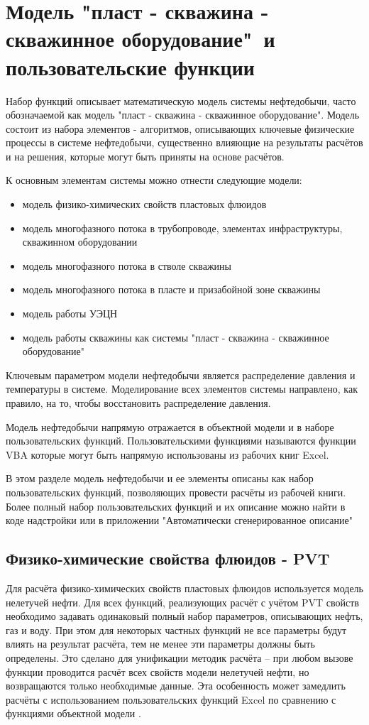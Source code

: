 \chapter{Модель "пласт - скважина - скважинное оборудование"\ и пользовательские функции \unf{}}
Набор функций \unf{} описывает математическую модель системы нефтедобычи, часто обозначаемой как модель "пласт - скважина - скважинное оборудование". Модель состоит из набора элементов - алгоритмов, описывающих ключевые физические процессы в системе нефтедобычи, существенно влияющие на результаты расчётов и на решения, которые могут быть приняты на основе расчётов.

К основным элементам системы можно отнести следующие модели:
\begin{itemize}
	\item модель физико-химических свойств пластовых флюидов
	\item модель многофазного потока в трубопроводе, элементах инфраструктуры, скважинном оборудовании
	\item модель многофазного потока в стволе скважины
	\item модель многофазного потока в пласте и призабойной зоне скважины
	\item модель работы УЭЦН
	\item модель работы скважины как системы "пласт - скважина - скважинное оборудование"
\end{itemize}

Ключевым параметром модели нефтедобычи является распределение давления и температуры в системе. Моделирование всех элементов системы направлено, как правило, на то, чтобы восстановить распределение давления.

Модель нефтедобычи напрямую отражается в объектной модели \unf{} и в наборе пользовательских функций. Пользовательскими функциями называются функции VBA которые могут быть напрямую использованы из рабочих книг Excel. 

В этом разделе модель нефтедобычи и ее элементы описаны как набор пользовательских функций, позволяющих провести расчёты из рабочей книги. Более полный набор пользовательских функций и их описание можно найти в коде надстройки или в приложении "Автоматически сгенерированное описание"

\section{Физико-химические свойства флюидов - PVT}
Для расчёта физико-химических свойств пластовых флюидов используется модель нелетучей нефти. Для всех функций, реализующих расчёт с учётом PVT свойств необходимо задавать одинаковый полный набор параметров, описывающих нефть, газ и воду.  При этом для некоторых частных функций не все параметры будут влиять на результат расчёта, тем не менее эти параметры должны быть определены. Это сделано для унификации методик расчёта – при любом вызове функции проводится расчёт всех свойств модели нелетучей нефти, но возвращаются только необходимые данные. Эта особенность может замедлить расчёты с использованием пользовательских функций Excel по сравнению с функциями объектной модели \unf{}.
 
